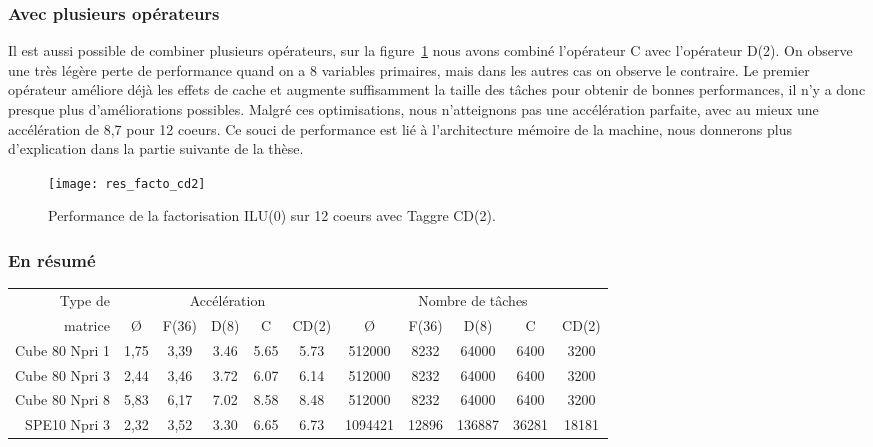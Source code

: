 \subsubsection{Avec plusieurs opérateurs}
Il est aussi possible de combiner plusieurs opérateurs, sur la figure~\ref{fig:res_facto_cd2} nous avons combiné l'opérateur C avec l'opérateur D(2).
%
On observe une très légère perte de performance quand on a 8 variables primaires, mais dans les autres cas on observe le contraire.
%
Le premier opérateur améliore déjà les effets de cache et augmente suffisamment la taille des tâches pour obtenir de bonnes performances, il n'y a donc presque plus d'améliorations possibles.
%
Malgré ces optimisations, nous n'atteignons pas une accélération parfaite, avec au mieux une accélération de 8,7 pour 12 coeurs.
%
Ce souci de performance est lié à l'architecture mémoire de la machine, nous donnerons plus d'explication dans la partie suivante de la thèse.


\begin{figure}[!h]
  \centering
  \texttt{[image: res\_facto\_cd2]}
  \caption{Performance de la factorisation ILU(0) sur 12 coeurs avec Taggre CD(2).}
  \label{fig:res_facto_cd2}
\end{figure}
\subsubsection{En résumé}

\begin{center}
  \begin{tabular}{|r|c|c|c|c|c|c|c|c|c|c|}
    \hline
    Type de  &  \multicolumn{5}{c|}{Accélération}  &  \multicolumn{5}{c|}{Nombre de tâches} \\
    matrice  &  \O & F(36) & D(8) & C & CD(2)  &  \O & F(36) & D(8) & C & CD(2)\\
    \hline
    Cube 80 Npri 1 & 1,75 & 3,39 & 3.46 & 5.65 & 5.73 & 512000  & 8232  & 64000  & 6400  & 3200 \\
    Cube 80 Npri 3 & 2,44 & 3,46 & 3.72 & 6.07 & 6.14 & 512000  & 8232  & 64000  & 6400  & 3200 \\
    Cube 80 Npri 8 & 5,83 & 6,17 & 7.02 & 8.58 & 8.48 & 512000  & 8232  & 64000  & 6400  & 3200 \\
    SPE10 Npri 3   & 2,32 & 3,52 & 3.30 & 6.65 & 6.73 & 1094421 & 12896 & 136887 & 36281 & 18181 \\
    \hline
  \end{tabular}
  \label{tab:facto_res}
\end{center}


